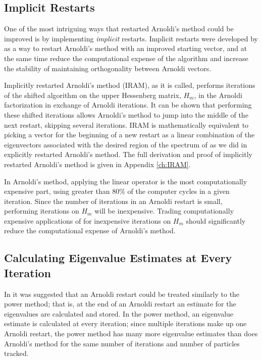\subsection{Implicit Restarts} \label{sec:IRAM}
One of the most intriguing ways that restarted Arnoldi's method could be improved is by implementing \emph{implicit} restarts.  Implicit restarts were developed by \citet{Sorensen:1992Impli-0} as a way to restart Arnoldi's method with an improved starting vector, and at the same time reduce the computational expense of the algorithm and increase the stability of maintaining orthogonality between Arnoldi vectors.  

Implicitly restarted Arnoldi's method (IRAM), as it is called, performs iterations of the shifted \QR algorithm on the upper Hessenberg matrix, $H_m$, in the Arnoldi factorization in exchange of Arnoldi iterations.  It can be shown that performing these shifted \QR iterations allows Arnoldi's method to jump into the middle of the next restart, skipping several iterations.  IRAM is mathematically equivalent to picking a vector for the beginning of a new restart as a linear combination of the eigenvectors associated with the desired region of the spectrum of \A{} as we did in explicitly restarted Arnoldi's method.  The full derivation and proof of implicitly restarted Arnoldi's method is given in Appendix \ref{ch:IRAM}.

In Arnoldi's method, applying the linear operator \A{} is the most computationally expensive part, using greater than 80\% of the computer cycles in a given iteration.  Since the number of iterations in an Arnoldi restart is small, performing \QR iterations on $H_m$ will be inexpensive.  Trading computationally expensive applications of \A{} for inexpensive \QR iterations on $H_m$ should significantly reduce the computational expense of Arnoldi's method.

\subsection{Calculating Eigenvalue Estimates at Every Iteration}
In  it was suggested that an Arnoldi restart could be treated similarly to the power method; that is, at the end of an Arnoldi restart an estimate for the eigenvalues are calculated and stored.  In the power method, an eigenvalue estimate is calculated at every iteration; since multiple iterations make up one Arnoldi restart, the power method has many more eigenvalue estimates than does Arnoldi's method for the same number of iterations and number of particles tracked.


